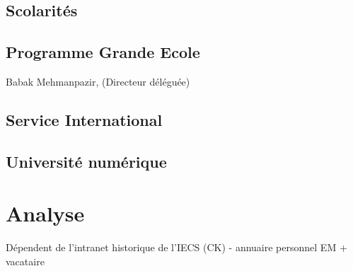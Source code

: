 \documentclass{book}
\begin{document}
 
\section{Scolarités}

\section{Programme Grande Ecole}
Babak Mehmanpazir, (Directeur déléguée)

\section{Service International}

\section{Université numérique}



\chapter{Analyse}


Dépendent de l'intranet historique de l'IECS (CK)
- annuaire personnel EM + vacataire




\appendix
%
\printindex
\end{document}
